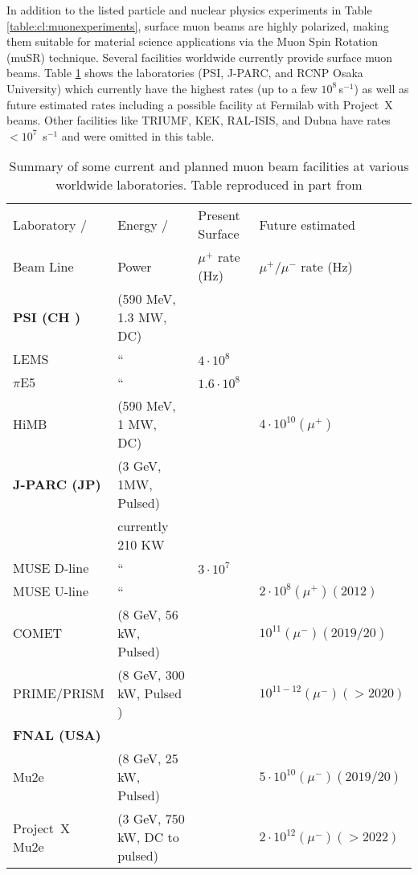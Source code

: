 In addition to the listed particle and nuclear physics experiments in Table \ref{table:cl:muonexperiments}, surface muon beams are highly polarized, making them suitable for material science applications via the Muon Spin Rotation (muSR) technique. Several facilities worldwide currently provide surface muon beams. Table \ref{table:cl:muonrates} shows the laboratories (PSI, J-PARC, and RCNP Osaka University) which currently have the highest rates (up to a few $10^8$\,s$^{-1}$) as well as future estimated rates including a possible facility at Fermilab with Project~X beams. Other facilities like TRIUMF, KEK, RAL-ISIS, and Dubna have rates $< 10^7$ \,s$^{-1}$ and were omitted in this table.

\begin{table}[ht]
\begin{center}
\caption{Summary of some current and planned muon beam facilities at various worldwide laboratories. Table reproduced in part from \cite{Blondel:2013ia} \label{table:cl:muonrates}}
{ \begin{tabular}{llll}\\
\hline
Laboratory / & Energy / & Present Surface  & Future estimated  \\
Beam Line & Power & $\mu^{+}$ rate (Hz) & $\mu^{+}/\mu^{-}$ rate (Hz) \\
\hline
\bf{PSI (CH )} & (590 MeV, 1.3 MW, DC) &  & \\
LEMS & `` & $4 \cdot 10^8$ &  \\
$\pi$E5 & `` & $1.6 \cdot 10^8$  & \\
HiMB & (590 MeV, 1 MW, DC) & & $4\cdot 10^{10} (\mu^{+})$ \\
\hline
\bf{J-PARC (JP)} & (3 GeV, 1MW, Pulsed) & & \\
 & currently 210 KW &  & \\
 MUSE D-line & `` & $3 \cdot 10^7$ & \\
 MUSE U-line & `` &  & $2\cdot 10^8 (\mu^{+})(2012)$ \\
 COMET & (8 GeV, 56 kW, Pulsed) & & $10^{11} (\mu^{-})(2019/20) $\\
 PRIME/PRISM & (8 GeV, 300 kW, Pulsed ) & & $10^{11-12}(\mu^{-}) ( > 2020)$ \\
 \hline
 \bf{FNAL (USA)} & &  & \\
 Mu2e & (8 GeV, 25 kW, Pulsed) & & $5\cdot 10^{10} (\mu^{-})(2019/20) $\\ 
 Project~X Mu2e & (3 GeV, 750 kW, DC to pulsed) & & $2\cdot 10^{12} (\mu^{-})(>2022)$ \\
\hline 
\end{tabular}}
\end{center}
\end{table}


